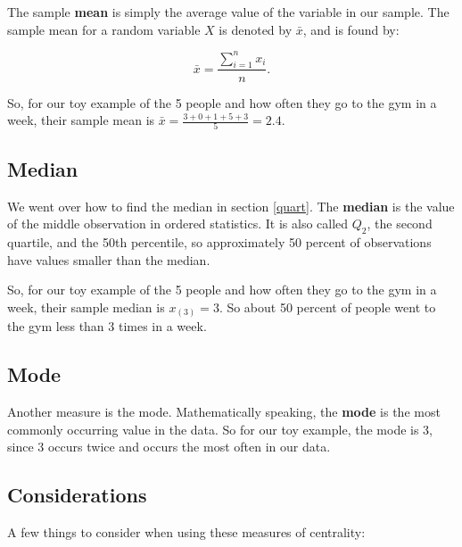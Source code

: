 \documentclass[
]{book}
\begin{document}
The sample \textbf{mean} is simply the average value of the variable in our sample. The sample mean for a random variable \(X\) is denoted by \(\bar{x}\), and is found by:

\begin{equation} 
\bar{x} = \frac{\sum_{i=1}^n x_i}{n}.
\label{eq:mean}
\end{equation}

So, for our toy example of the 5 people and how often they go to the gym in a week, their sample mean is \(\bar{x} = \frac{3+0+1+5+3}{5} = 2.4\).

\hypertarget{median}{%
\subsection{Median}\label{median}}

We went over how to find the median in section \ref{quart}. The \textbf{median} is the value of the middle observation in ordered statistics. It is also called \(Q_2\), the second quartile, and the 50th percentile, so approximately 50 percent of observations have values smaller than the median.

So, for our toy example of the 5 people and how often they go to the gym in a week, their sample median is \(x_{(3)} = 3\). So about 50 percent of people went to the gym less than 3 times in a week.

\hypertarget{mode}{%
\subsection{Mode}\label{mode}}

Another measure is the mode. Mathematically speaking, the \textbf{mode} is the most commonly occurring value in the data. So for our toy example, the mode is 3, since 3 occurs twice and occurs the most often in our data.

\hypertarget{considerations}{%
\subsection{Considerations}\label{considerations}}

A few things to consider when using these measures of centrality:
\end{document}
